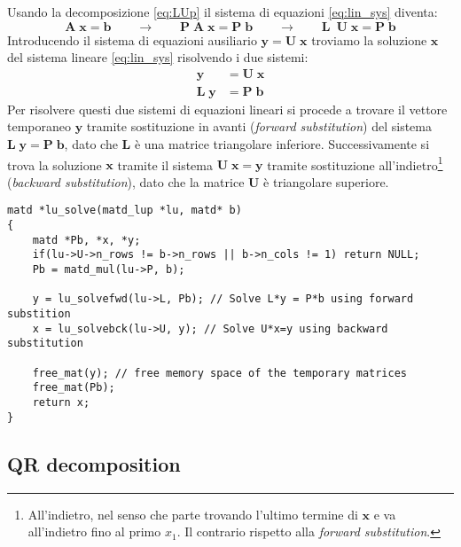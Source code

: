 \documentclass[10pt]{article}
\begin{document}
Usando la decomposizione \eqref{eq:LUp} il sistema di equazioni \eqref{eq:lin_sys} diventa:
\begin{equation}
\mathbf{A} \; \mathbf{x} = \mathbf{b}
\qquad \rightarrow \qquad
\mathbf{P} \; \mathbf{A} \; \mathbf{x} = \mathbf{P} \; \mathbf{b}
\qquad \rightarrow \qquad
\mathbf{L}\ \; \mathbf{U} \; \mathbf{x} = \mathbf{P} \; \mathbf{b}
\end{equation}
Introducendo il sistema di equazioni ausiliario $\mathbf{y} = \mathbf{U} \; \mathbf{x}$ troviamo la soluzione $\mathbf{x}$ del sistema lineare \eqref{eq:lin_sys} risolvendo i due sistemi:
\begin{align}
\mathbf{y} & = \mathbf{U} \; \mathbf{x} \\
\mathbf{L} \; \mathbf{y} & = \mathbf{P} \; \mathbf{b}
\end{align}
Per risolvere questi due sistemi di equazioni lineari si procede a trovare il vettore temporaneo $\mathbf{y}$ tramite sostituzione in avanti (\textit{forward substitution}) del sistema $\mathbf{L} \; \mathbf{y} = \mathbf{P} \; \mathbf{b}$, dato che $\mathbf{L}$ è una matrice triangolare inferiore. Successivamente si trova la soluzione $\mathbf{x}$ tramite il sistema $\mathbf{U} \; \mathbf{x} = \mathbf{y}$ tramite sostituzione all'indietro\footnote{All'indietro, nel senso che parte trovando l'ultimo termine di $\mathbf{x}$ e va all'indietro fino al primo $x_1$. Il contrario rispetto alla \textit{forward substitution}.} (\textit{backward substitution}), dato che la matrice $\mathbf{U}$ è triangolare superiore.

\begin{lstlisting}
matd *lu_solve(matd_lup *lu, matd* b)
{
	matd *Pb, *x, *y;
	if(lu->U->n_rows != b->n_rows || b->n_cols != 1) return NULL;
	Pb = matd_mul(lu->P, b);
	
	y = lu_solvefwd(lu->L, Pb); // Solve L*y = P*b using forward substition
	x = lu_solvebck(lu->U, y); // Solve U*x=y using backward substitution
	
	free_mat(y); // free memory space of the temporary matrices	
	free_mat(Pb);
	return x;
}
\end{lstlisting}




\subsection{QR decomposition}
\end{document}
